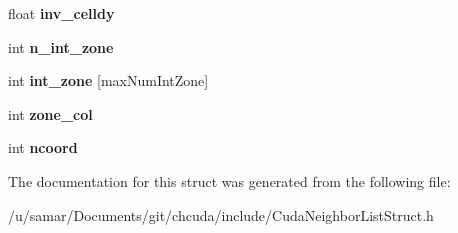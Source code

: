 \begin{DoxyCompactItemize}
float {\bfseries inv\+\_\+celldy}
\item 
\hypertarget{structZoneParam__t_a05a7fbb2a7d4ec6c91c7235b9053eff0}{}\label{structZoneParam__t_a05a7fbb2a7d4ec6c91c7235b9053eff0} 
int {\bfseries n\+\_\+int\+\_\+zone}
\item 
\hypertarget{structZoneParam__t_a04677d1510bdff690da67d24014a3c12}{}\label{structZoneParam__t_a04677d1510bdff690da67d24014a3c12} 
int {\bfseries int\+\_\+zone} \mbox{[}max\+Num\+Int\+Zone\mbox{]}
\item 
\hypertarget{structZoneParam__t_a47892717e754ba68520edd16fb4a76cd}{}\label{structZoneParam__t_a47892717e754ba68520edd16fb4a76cd} 
int {\bfseries zone\+\_\+col}
\item 
\hypertarget{structZoneParam__t_a74728e7abeb4f6b9c45a88257f0d79b4}{}\label{structZoneParam__t_a74728e7abeb4f6b9c45a88257f0d79b4} 
int {\bfseries ncoord}
\end{DoxyCompactItemize}


The documentation for this struct was generated from the following file\+:\begin{DoxyCompactItemize}
\item 
/u/samar/\+Documents/git/chcuda/include/Cuda\+Neighbor\+List\+Struct.\+h\end{DoxyCompactItemize}
